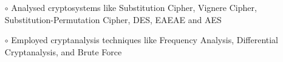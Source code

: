 \documentclass[10.8pt, a4paper]{extarticle}
\begin{document}
\begin{itemize}
	\begin{itemize}
	    \item[$\circ$] Analysed cryptosystems like Substitution Cipher, Vignere Cipher, Substitution-Permutation Cipher, DES, EAEAE and AES \\[-0.6cm]
	    \item[$\circ$] Employed cryptanalysis techniques like Frequency Analysis, Differential Cryptanalysis, and Brute Force \\[-0.6cm]
	\end{itemize}
  \vspace{0.055cm}

\end{itemize}
\end{document}
